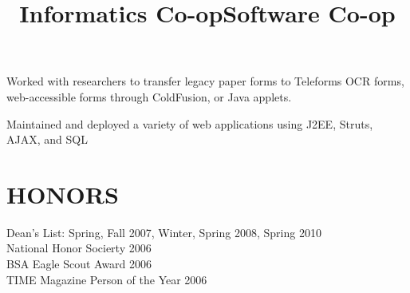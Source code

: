 \documentclass[line]{res}
\begin{document}
\begin{resume}
    \title{Informatics Co-op}
    \begin{position}
        Worked with researchers to transfer legacy paper forms to Teleforms OCR
        forms, web-accessible forms through ColdFusion, or Java applets.
    \end{position}

    \title{Software Co-op}
    \begin{position}
        Maintained and deployed a variety of web applications using J2EE,
        Struts, AJAX, and SQL
    \end{position}

\section{HONORS}
    Dean's List: Spring, Fall 2007, Winter, Spring 2008, Spring 2010 \\
    National Honor Socierty 2006 \\
    BSA Eagle Scout Award 2006 \\
    TIME Magazine Person of the Year 2006

\end{resume}
\end{document}
